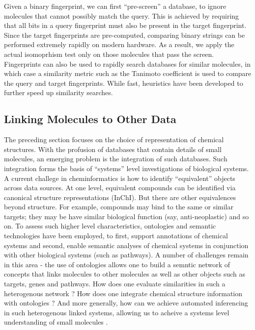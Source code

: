 \documentclass{sig-alternate}
\begin{document}
Given a binary fingerprint, we can first ``pre-screen'' a database, to
ignore molecules that cannot possibly match the query. This is
achieved by requiring that all bits in a query fingerprint must also
be present in the target fingerprint. Since the target fingerprints
are pre-computed, comparing binary strings can be performed extremely
rapidly on modern hardware. As a result, we apply the actual
isomoprhism test only on those molecules that pass the
screen. Fingerprints can also be used to rapidly search databases for
similar molecules, in which case a similarity metric such as the
Tanimoto coefficient is used to compare the query and target
fingerprints. While fast, heuristics have been developed
\cite{Swamidass:2007ve} to further
speed up similarity searches.

\subsection{Linking Molecules to Other Data}
\label{sec:prof-ident}

The preceding section focuses on the choice of representation of
chemical structures. With the profusion of databases that contain
details of small molecules, an emerging problem is the integration of
such databases. Such integration forms the basis of ``systems'' level
investigations of biological systems. A current challege in
cheminformatics is how to identify ``equivalent'' objects across data
sources. At one level, equivalent compounds can be identified via
canonical structure representations (InChI). But there are other
equivalences beyond structure. For example, compounds may bind to the
same or similar targets; they may be have similar biological function
(say, anti-neoplastic) and so on. To assess such higher level
characteristics, ontologies and semantic technologies have been
employed, to first, support annotations of chemical systems and
second, enable semantic analyses of chemical systems in conjunction
with other biological systems (such as pathways). A number of
challenges remain in this area - the use of ontologies allows one to
build a semntic network of concepts that links molecules to other
molecules as well as other objects such as targets, genes and
pathways. How does one evaluate similarities in such a heterogenous
network \cite{couto2010}? How does one integrate chemical structure
information with ontologies \cite{hastingsowled2010}? And more
generally, how can we achieve automated inferencing in such
heterogenous linked systems, allowing us to acheive a systems level
understanding of small molecules \cite{Oprea:2007fk}.
\end{document}
